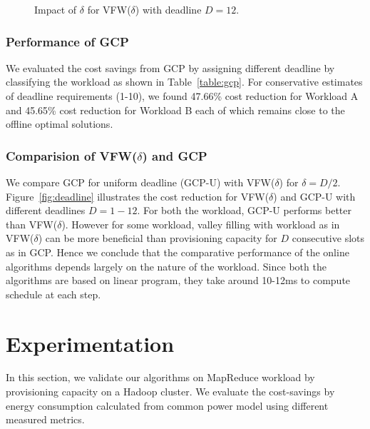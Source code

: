 \documentclass[10pt,conference,compsocconf,letterpaper]{IEEEtran}
\begin{document}
\begin{figure}[!t]
\centerline{
\hfil
{}}
\caption{Impact of $\delta$ for VFW($\delta$) with deadline $D=12$. }
\label{fig:delta}
\end{figure}


\subsubsection*{Performance of GCP}
We evaluated the cost savings from GCP by assigning different deadline by classifying the workload as shown in Table~\ref{table:gcp}. For conservative estimates of deadline requirements (1-10), we found 47.66\% cost reduction for Workload A and 45.65\% cost reduction for Workload B each of which remains close to the offline optimal solutions.






\subsubsection*{Comparision of VFW($\delta$) and GCP}
We compare GCP for uniform deadline (GCP-U) with VFW($\delta$) for $\delta=D/2$. Figure~\ref{fig:deadline} illustrates the cost reduction for VFW($\delta$) and GCP-U with different deadlines $D = 1-12$. For both the workload, GCP-U performs better than VFW($\delta$). However for some workload, valley filling with workload as in VFW($\delta$) can be more beneficial than provisioning capacity for $D$ consecutive slots as in GCP. Hence we conclude that the comparative performance of the online algorithms depends largely on the nature of the workload. Since both the algorithms are based on linear program, they take around 10-12ms to compute schedule at each step.















\section{Experimentation}
In this section, we validate our algorithms on MapReduce workload by provisioning capacity on a Hadoop cluster. We evaluate the cost-savings by energy consumption calculated from common power model using different measured metrics.
\end{document}
